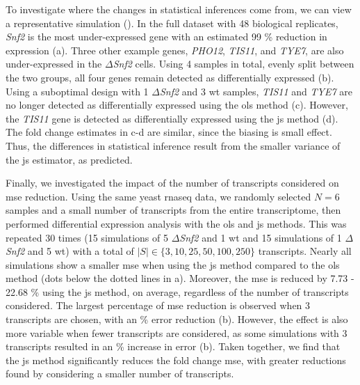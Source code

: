 To investigate where the changes in statistical inferences come from, we can view a representative simulation ().
In the full dataset with 48 biological replicates, \emph{Snf2} is the most under-expressed gene with an estimated 99 \% reduction in expression (a).
Three other example genes, \emph{PHO12}, \emph{TIS11}, and \emph{TYE7}, are also under-expressed in the $\Delta$\emph{Snf2} cells.
Using 4 samples in total, evenly split between the two groups, all four genes remain detected as differentially expressed (b).
Using a suboptimal design with 1 $\Delta$\emph{Snf2} and 3 \gls{wt} samples, \emph{TIS11} and \emph{TYE7} are no longer detected as differentially expressed using the \gls{ols} method (c).
However, the \emph{TIS11} gene is detected as differentially expressed using the \gls{js} method (d).
The fold change estimates in c-d are similar, since the biasing is small effect.
Thus, the differences in statistical inference result from the smaller variance of the \gls{js} estimator, as predicted.


Finally, we investigated the impact of the number of transcripts considered on \gls{mse} reduction.
Using the same yeast \gls{rnaseq} data, we randomly selected $N = 6$ samples and a small number of transcripts from the entire transcriptome, then performed differential expression analysis with the \gls{ols} and \gls{js} methods.
This was repeated 30 times (15 simulations of 5 $\Delta$\emph{Snf2} and 1 \gls{wt} and 15 simulations of 1 $\Delta$\emph{Snf2} and 5 \gls{wt}) with a total of $|S| \in \{ 3, 10, 25, 50, 100, 250 \}$ transcripts.
Nearly all simulations show a smaller \gls{mse} when using the \gls{js} method compared to the \gls{ols} method (dots below the dotted lines in a).
Moreover, the \gls{mse} is reduced by 7.73 - 22.68 \% using the \gls{js} method, on average, regardless of the number of transcripts considered.
The largest percentage of \gls{mse} reduction is observed when 3 transcripts are chosen, with an  \% error reduction (b).
However, the effect is also more variable when fewer transcripts are considered, as some simulations with 3 transcripts resulted in an  \% increase in error (b).
Taken together, we find that the \gls{js} method significantly reduces the fold change \gls{mse}, with greater reductions found by considering a smaller number of transcripts.

